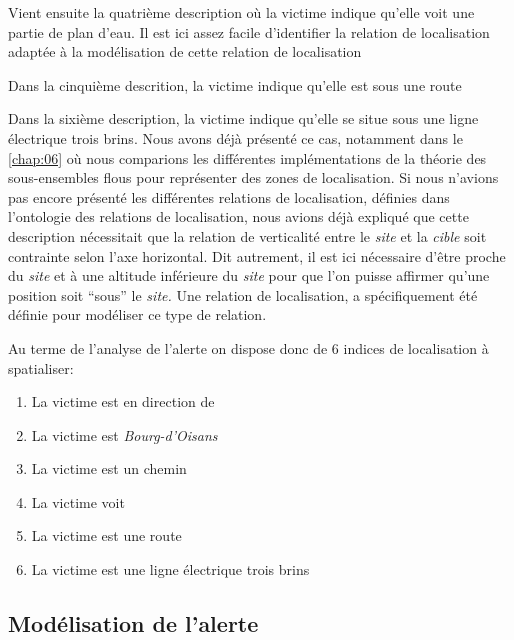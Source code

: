 Vient ensuite la quatrième description où la victime indique qu'elle
voit une partie de plan d'eau.
%
Il est ici assez facile d’identifier la relation de localisation
adaptée à la modélisation de cette relation de localisation



Dans la cinquième descrition, la victime indique qu'elle est sous une
route


Dans la sixième description, la victime indique qu'elle se situe sous
une ligne électrique trois brins.
%
Nous avons déjà présenté ce cas, notamment dans le \autoref{chap:06}
où nous comparions les différentes implémentations de la théorie des
sous-ensembles flous pour représenter des zones de localisation. Si
nous n'avions pas encore présenté les différentes relations de
localisation, définies dans l'ontologie des relations de localisation,
nous avions déjà expliqué que cette description nécessitait que la
relation de verticalité entre le \emph{site} et la \emph{cible} soit
contrainte selon l'axe horizontal. Dit autrement, il est ici
nécessaire d'être proche du \emph{site} et à une altitude inférieure
du \emph{site} pour que l'on puisse affirmer qu'une position soit
\enquote{sous} le \emph{site.} Une relation de localisation,
 a spécifiquement été définie pour modéliser ce
type de relation.


Au terme de l'analyse de l'alerte on dispose donc de 6 indices de
localisation à spatialiser:
% 
\begin{enumerate}
\item \label{ind:fr1} La victime est en direction de
\item \label{ind:fr2} La victime est
   \emph{Bourg-d'Oisans} 
\item \label{ind:fr3} La victime est  un
  chemin
\item \label{ind:fr4} La victime voit
\item \label{ind:fr5} La victime est  une
  route
\item \label{ind:fr6} La victime est  une
  ligne électrique trois brins
\end{enumerate}



\subsection{Modélisation de l'alerte}
\label{subsec:9-4-2}

